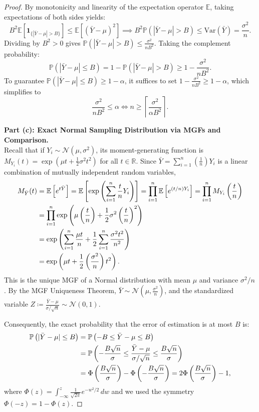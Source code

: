 \documentclass[11pt, letterpaper]{article}
\theoremstyle{definition}
\theoremstyle{remark}
\newcommand{\R}{\mathbb{R}}
\newcommand{\E}{\mathbb{E}}
\newcommand{\Prob}{\mathbb{P}}
\begin{document}
\begin{proof}
By monotonicity and linearity of the expectation operator $\E$, taking expectations of both sides yields:
\[
    B^2 \E\left[\mathbf{1}_{\{|\bar{Y} - \mu| > B\}}\right] \le \E\left[(\bar{Y} - \mu)^2\right] \implies B^2 \Prob(|\bar{Y} - \mu| > B) \le \text{Var}(\bar{Y}) = \frac{\sigma^2}{n}.
\]
Dividing by $B^2 > 0$ gives $\Prob(|\bar{Y} - \mu| > B) \le \frac{\sigma^2}{n B^2}$. Taking the complement probability:
\[
    \Prob\left(|\bar{Y} - \mu| \le B\right) = 1 - \Prob\left(|\bar{Y} - \mu| > B\right) \ge 1 - \frac{\sigma^2}{n B^2}.
\]
To guarantee $\Prob(|\bar{Y} - \mu| \le B) \ge 1 - \alpha$, it suffices to set $1 - \frac{\sigma^2}{n B^2} \ge 1 - \alpha$, which simplifies to
\[
    \frac{\sigma^2}{n B^2} \le \alpha \iff n \ge \left\lceil \frac{\sigma^2}{\alpha B^2} \right\rceil.
\]

\textbf{Part (c): Exact Normal Sampling Distribution via MGFs and Comparison.} \\ \relax
Recall that if $Y_i \sim \mathcal{N}(\mu, \sigma^2)$, its moment-generating function is $M_{Y_i}(t) = \exp\left(\mu t + \frac{1}{2}\sigma^2 t^2\right)$ for all $t \in \R$. Since $\bar{Y} = \sum_{i=1}^n \left(\frac{1}{n}\right) Y_i$ is a linear combination of mutually independent random variables,
\begin{align*}
    M_{\bar{Y}}(t) &= \E\left[e^{t\bar{Y}}\right] = \E\left[\exp\left(\sum_{i=1}^{n} \frac{t}{n} Y_i\right)\right] = \prod_{i=1}^{n} \E\left[e^{(t/n)Y_i}\right] = \prod_{i=1}^{n} M_{Y_i}\left(\frac{t}{n}\right) \\ \relax
    &= \prod_{i=1}^{n} \exp\left(\mu\left(\frac{t}{n}\right) + \frac{1}{2}\sigma^2\left(\frac{t}{n}\right)^2\right) \\ \relax
    &= \exp\left(\sum_{i=1}^{n} \frac{\mu t}{n} + \frac{1}{2} \sum_{i=1}^{n} \frac{\sigma^2 t^2}{n^2}\right) \\ \relax
    &= \exp\left(\mu t + \frac{1}{2}\left(\frac{\sigma^2}{n}\right) t^2\right).
\end{align*}
This is the unique MGF of a Normal distribution with mean $\mu$ and variance $\sigma^2/n$. By the MGF Uniqueness Theorem, $\bar{Y} \sim \mathcal{N}\left(\mu, \frac{\sigma^2}{n}\right)$, and the standardized variable $Z \coloneqq \frac{\bar{Y} - \mu}{\sigma/\sqrt{n}} \sim \mathcal{N}(0, 1)$.

Consequently, the exact probability that the error of estimation is at most $B$ is:
\begin{align*}
    \Prob\left(|\bar{Y} - \mu| \le B\right) &= \Prob\left(-B \le \bar{Y} - \mu \le B\right) \\ \relax
    &= \Prob\left(-\frac{B\sqrt{n}}{\sigma} \le \frac{\bar{Y} - \mu}{\sigma/\sqrt{n}} \le \frac{B\sqrt{n}}{\sigma}\right) \\ \relax
    &= \Phi\left(\frac{B\sqrt{n}}{\sigma}\right) - \Phi\left(-\frac{B\sqrt{n}}{\sigma}\right) = 2\Phi\left(\frac{B\sqrt{n}}{\sigma}\right) - 1,
\end{align*}
where $\Phi(z) = \int_{-\infty}^z \frac{1}{\sqrt{2\pi}} e^{-w^2/2}\,dw$ and we used the symmetry $\Phi(-z) = 1 - \Phi(z)$.


\end{proof}
\end{document}
